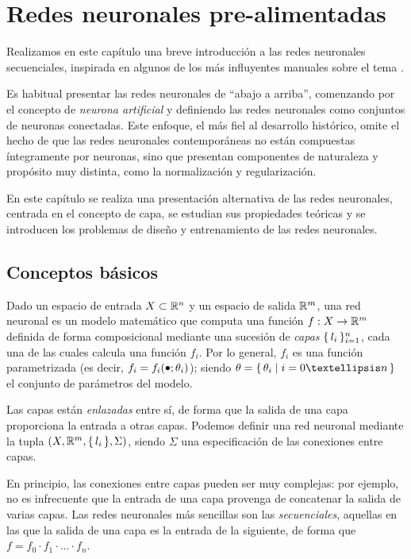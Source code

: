\chapter{Redes neuronales pre-alimentadas}
Realizamos en este capítulo una breve introducción a las redes neuronales secuenciales, inspirada en algunos de los más influyentes manuales sobre el tema \cite{goodfellow2016deep, bishop2006pattern}.

Es habitual presentar las redes neuronales de ``abajo a arriba'', comenzando por el concepto de \textit{neurona artificial} y definiendo las redes neuronales como conjuntos de neuronas conectadas. Este enfoque, el más fiel al desarrollo histórico, omite el hecho de que las redes neuronales contemporáneas no están compuestas íntegramente por neuronas, sino que presentan componentes de naturaleza y propósito muy distinta, como la normalización y regularización. 

En este capítulo se realiza una presentación alternativa de las redes neuronales, centrada en el concepto de capa, se estudian sus propiedades teóricas y se introducen los problemas de diseño y entrenamiento de las redes neuronales.

\section{Conceptos básicos}
Dado un espacio de entrada \( X \subset \mathbb{R}^{n} \) y un espacio de salida \( \mathbb{R}^{m} \), una red neuronal es un modelo matemático que computa una función \( f: X \to \mathbb{R}^{m} \) definida de forma composicional mediante una sucesión de \textit{capas} \( \{\,l_{i}\,\}_{i=1}^n \), cada una de las cuales calcula una función \( f_{i} \). Por lo general, \( f_{i} \) es una función parametrizada (es decir, \( f_{i} = f_{i}(\mathord{\smallbullet}; \theta_i) \)); siendo \( \theta = \Set{\theta_i \mid i = 0 … n} \) el conjunto de parámetros del modelo.

Las capas están \textit{enlazadas} entre sí, de forma que la salida de una capa proporciona la entrada a otras capas. Podemos definir una red neuronal mediante la tupla \( (X, \mathbb{R}^{m}, \{\, l_i \,\}, \Sigma) \), siendo \( \Sigma \) una especificación de las conexiones entre capas.

En principio, las conexiones entre capas pueden ser muy complejas: por ejemplo, no es infrecuente que la entrada de una capa provenga de concatenar la salida de varias capas. Las redes neuronales más sencillas son las \textit{secuenciales}, aquellas en las que la salida de una capa es la entrada de la siguiente, de forma que \( f = f_{0} \cdot f_{1} \cdot … \cdot f_{n} \).

